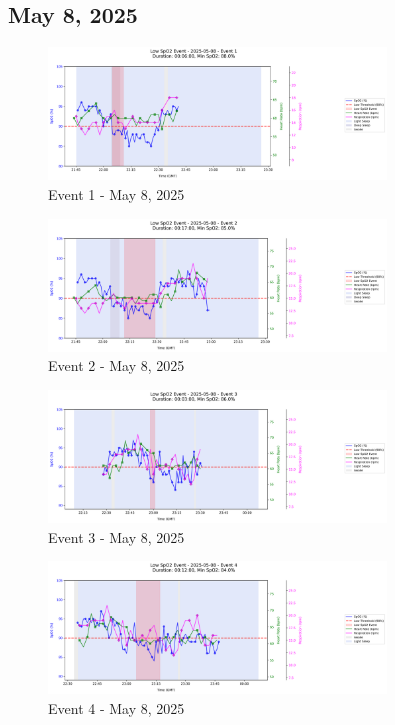 \documentclass{article}
\begin{document}
\subsection{May 8, 2025}
\begin{figure}[htbp]
    \centering
    \includegraphics[width=0.8\textwidth]{images/2025-05-08_event_1.png}
    \caption{Event 1 - May 8, 2025}
\end{figure}
\begin{figure}[htbp]
    \centering
    \includegraphics[width=0.8\textwidth]{images/2025-05-08_event_2.png}
    \caption{Event 2 - May 8, 2025}
\end{figure}
\begin{figure}[htbp]
    \centering
    \includegraphics[width=0.8\textwidth]{images/2025-05-08_event_3.png}
    \caption{Event 3 - May 8, 2025}
\end{figure}
\begin{figure}[htbp]
    \centering
    \includegraphics[width=0.8\textwidth]{images/2025-05-08_event_4.png}
    \caption{Event 4 - May 8, 2025}
\end{figure}
\end{document}
